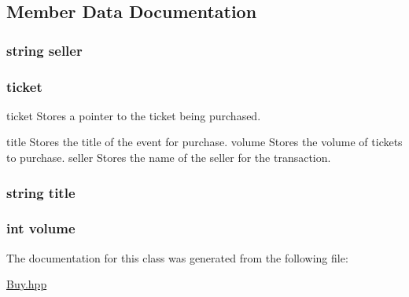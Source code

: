 \subsection{Member Data Documentation}
\hypertarget{class_buy_a8cdc0977faad029fbb45ab09035319b9}{
\subsubsection[{seller}]{\setlength{\rightskip}{0pt plus 5cm}string seller\hspace{0.3cm}{\ttfamily [private]}}}\label{class_buy_a8cdc0977faad029fbb45ab09035319b9}
\hypertarget{class_buy_a6717a14bf73091b2dc94a3908cbd03ac}{
\subsubsection[{ticket}]{ ticket\hspace{0.3cm}{\ttfamily [private]}}}\label{class_buy_a6717a14bf73091b2dc94a3908cbd03ac}


ticket Stores a pointer to the ticket being purchased. 

title Stores the title of the event for purchase. volume Stores the volume of tickets to purchase. seller Stores the name of the seller for the transaction. \hypertarget{class_buy_a43a5eafe64b96968035e5a4013e47c75}{
\subsubsection[{title}]{\setlength{\rightskip}{0pt plus 5cm}string title\hspace{0.3cm}{\ttfamily [private]}}}\label{class_buy_a43a5eafe64b96968035e5a4013e47c75}
\hypertarget{class_buy_aed48ca0bcd2162fd4fd495873e2631f5}{
\subsubsection[{volume}]{\setlength{\rightskip}{0pt plus 5cm}int volume\hspace{0.3cm}{\ttfamily [private]}}}\label{class_buy_aed48ca0bcd2162fd4fd495873e2631f5}


The documentation for this class was generated from the following file\-:\begin{DoxyCompactItemize}
\item 
\hyperlink{_buy_8hpp}{Buy.\-hpp}\end{DoxyCompactItemize}
